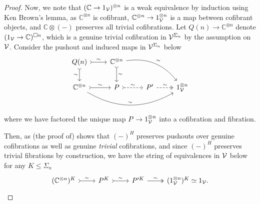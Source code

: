 \documentclass[a4paper,10pt
]{article}%
\renewcommand{\1}{\ensuremath{\mathbb{id}}}
\begin{document}
\begin{proof}
      Now,
      we note that $(\mathbb C \to 1_{\mathcal V})^{\otimes n}$ is a weak equivalence by induction using Ken Brown's lemma,
      as $\mathbb C^{\otimes n}$ is cofibrant,
      $\mathbb C^{\otimes n} \to 1_{\mathcal V}^{\otimes n}$ is a map between cofibrant objects,
      and $\mathbb C \otimes (-)$ preserves all trivial cofibrations.
      Let $Q(n) \to \mathbb C^{\otimes n}$ denote $(1_{\mathcal V} \to \mathbb C)^{\square n}$,
      which is a genuine trivial cofibration in $\mathcal V^{\Sigma_n}$ by the assumption on $\mathcal V$.
      Consider the pushout and induced maps in $\mathcal V^{\Sigma_n}$ below
      \begin{equation}
            \begin{tikzcd}
                  Q(n) \arrow[r, tail, "\sim"] \arrow[d, tail, "\sim"']
                  &
                  \mathbb C^{\otimes n} \arrow[d, tail, "\sim"] \arrow[drr, bend left, "\sim"]
                  \\
                  \mathbb C^{\otimes n} \arrow[r, tail, "\sim"] \arrow[rrr, bend right, "\sim"]
                  &
                  P \arrow[r, tail, dashed, "\sim"]
                  &
                  P' \arrow[r, two heads, "\sim", dashed]
                  &
                  1_\V^{\otimes n}
            \end{tikzcd}
      \end{equation}
      where we have factored the unique map $P \to 1_{\mathcal V}^{\otimes n}$ into a cofibration and fibration.

      Then, as (the proof of) \cite[Prop 6.3]{BP17} shows that $(-)^H$ preserves pushouts over genuine cofibrations
      as well as genuine \textit{trivial} cofibrations,
      and since $(-)^H$ preserves trivial fibrations by construction,
      we have the string of equivalences in $\mathcal V$ below for any $K \leq \Sigma_n$
      \begin{equation}
            \begin{tikzcd}
                  (\mathbb C^{\otimes n})^K \arrow[r, tail, "\sim"]
                  &
                  P^K \arrow[r, tail, "\sim"]
                  &
                  P'^K \arrow[r, two heads, "\sim"]
                  &
                  (1_\V^{\otimes n})^K \simeq 1_\V.
            \end{tikzcd}
      \end{equation}
\end{proof}
\end{document}
